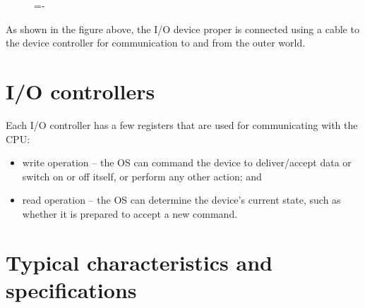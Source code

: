 \documentclass[a4paper]{systems-software}
\begin{document}
\begin{figure}[H]
  \lineskip=-\fboxrule
\end{figure}

As shown in the figure above, the I/O device proper is connected using a cable to the device controller for communication to and from the outer world.


\section*{I/O controllers}

Each I/O controller has a few registers that are used for communicating with the CPU:
\begin{itemize}
	\item write operation -- the OS can command the device to deliver/accept data or switch on or off itself, or perform any other action; and
	\item read operation -- the OS can determine the device's current state, such as whether it is prepared to accept a new command.
\end{itemize}


\section*{Typical characteristics and specifications}
\end{document}
